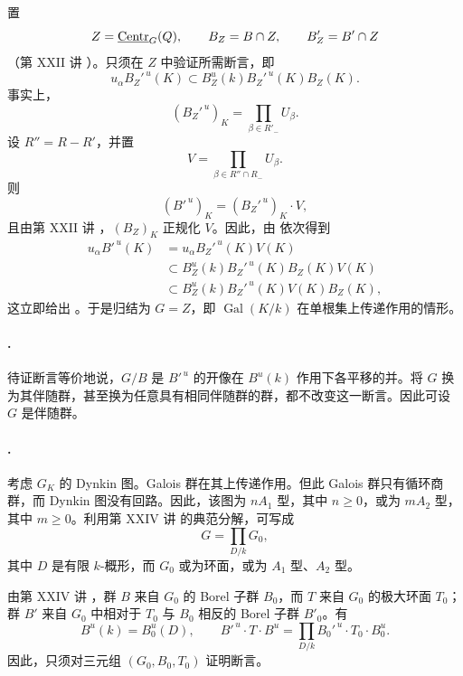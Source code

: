 置
\[
 Z=\underline{\operatorname{Centr}}_G(Q),\qquad B_Z=B\cap Z,\qquad B'_Z=B'\cap Z
\]
\textup{（第 XXII 讲 ）}。只须在 \(Z\) 中验证所需断言，即
\[
 u_\alpha B_Z'^{\,u}(K)
 \subset B_Z^u(k)B_Z'^{\,u}(K)B_Z(K).                 \tag{2}\label{sga3:xxvi:theorem:5-1:equation:2}
\]
事实上，
\[
 (B_Z'^{\,u})_K=\prod_{\beta\in R'_-}U_\beta.
\]
设 \(R''=R-R'\)，并置
\[
 V=\prod_{\beta\in R''\cap R_-}U_\beta.
\]
则
\[
 (B'^{\,u})_K=(B_Z'^{\,u})_K\cdot V,
\]
且由第 XXII 讲 ，\((B_Z)_K\) 正规化 \(V\)。因此，由 \textup{} 依次得到
\[
\begin{aligned}
 u_\alpha B'^{\,u}(K)
 &=u_\alpha B_Z'^{\,u}(K)V(K)\\
 &\subset B_Z^u(k)B_Z'^{\,u}(K)B_Z(K)V(K)\\
 &\subset B_Z^u(k)B_Z'^{\,u}(K)V(K)B_Z(K),
\end{aligned}
\]
这立即给出 \textup{}。于是归结为 \(G=Z\)，即 \(\operatorname{Gal}(K/k)\) 在单根集上传递作用的情形。

\paragraph{.}
待证断言等价地说，\(G/B\) 是 \(B'^{\,u}\) 的开像在 \(B^u(k)\) 作用下各平移的并。将 \(G\) 换为其伴随群，甚至换为任意具有相同伴随群的群，都不改变这一断言。因此可设 \(G\) 是伴随群。

\paragraph{.}
考虑 \(G_K\) 的 Dynkin 图。Galois 群在其上传递作用。但此 Galois 群只有循环商群，而 Dynkin 图没有回路。因此，该图为 \(nA_1\) 型，其中 \(n\geq0\)，或为 \(mA_2\) 型，其中 \(m\geq0\)。利用第 XXIV 讲  的典范分解，可写成
\[
 G=\prod_{D/k}G_0,
\]
其中 \(D\) 是有限 \(k\)-概形，而 \(G_0\) 或为环面，或为 \(A_1\) 型、\(A_2\) 型。

由第 XXIV 讲 ，群 \(B\) 来自 \(G_0\) 的 Borel 子群 \(B_0\)，而 \(T\) 来自 \(G_0\) 的极大环面 \(T_0\)；群 \(B'\) 来自 \(G_0\) 中相对于 \(T_0\) 与 \(B_0\) 相反的 Borel 子群 \(B'_0\)。有
\[
 B^{u}(k)=B_0^u(D),\qquad
 B'^{\,u}\cdot T\cdot B^u
 =\prod_{D/k}B_0'^{\,u}\cdot T_0\cdot B_0^u.
\]
因此，只须对三元组 \((G_0,B_0,T_0)\) 证明断言。

